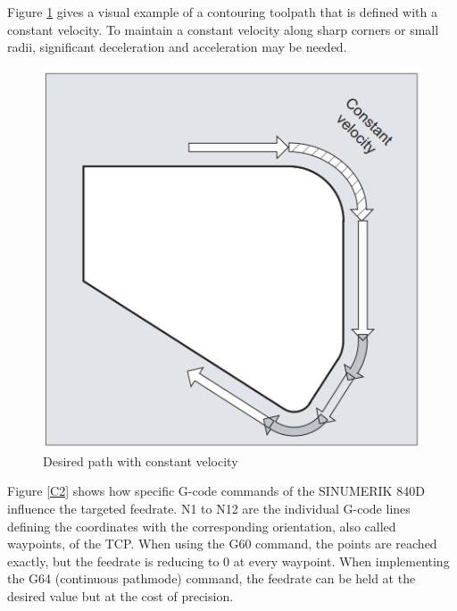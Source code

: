 Figure \ref{C1} gives a visual example of a contouring toolpath that is defined with a constant velocity. To maintain a constant velocity along sharp corners or small radii, significant deceleration and acceleration may be needed. 


 \begin{figure}[H]
 	\centerline{\includegraphics[scale=.25]{figures/conti.png}}
 	\caption{Desired path with constant velocity~\cite{sinumericmanual}}
 	\label{C1}
 \end{figure}

\newpage
Figure \ref{C2} shows how specific G-code commands of the SINUMERIK 840D influence the targeted feedrate. N1 to N12 are the individual G-code lines defining the coordinates with the corresponding orientation, also called waypoints, of the TCP.  When using the G60 command, the points are reached exactly, but the feedrate is reducing to 0 at every waypoint. When implementing the G64 (continuous pathmode) command, the feedrate can be held at the desired value but at the cost of precision.
 

